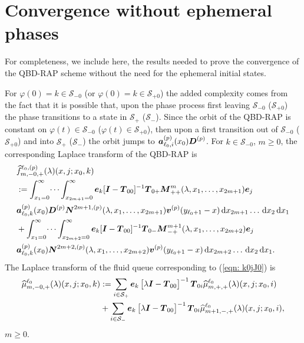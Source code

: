 \chapter{Convergence without ephemeral phases\label{app:extend conv}}
For completeness, we include here, the results needed to prove the convergence of the QBD-RAP scheme without the need for the ephemeral initial states.

For \(\varphi(0)=k\in\mathcal S_{-0}\) (or \(\varphi(0)=k\in\mathcal S_{+0}\)) the added complexity comes from the fact that it is possible that, upon the phase process first leaving \(\mathcal S_{-0}\) (\(\mathcal S_{+0}\)) the phase transitions to a state in \(\mathcal S_+\) (\(\mathcal S_-\)). Since the orbit of the QBD-RAP is constant on \(\varphi(t)\in\mathcal S_{-0}\) (\(\varphi(t)\in\mathcal S_{+0}\)), then upon a first transition out of \(\mathcal S_{-0}\) (\(\mathcal S_{+0}\)) and into \(\mathcal S_+\) (\(\mathcal S_-\)) the orbit jumps to \(\boldsymbol   a_{\ell_0,i}^{(p)}(x_0)\boldsymbol D^{(p)}\). For \(k\in\mathcal S_{-0}\), \(m\geq 0\), the corresponding Laplace transform of the QBD-RAP is
\begin{align}
	&\widehat{f}_{m,-0,+}^{\ell_0,(p)}(\lambda)(x,j;x_0,k)\nonumber 
	\\&:=\int_{x_1=0}^\infty \dots \int_{x_{2m+1}=0}^\infty  \boldsymbol e_k [\boldsymbol I - \boldsymbol T_{00}]^{-1}\boldsymbol T_{0+}\boldsymbol M^m_{++}(\lambda,x_1,\dots,x_{2m+1})\boldsymbol e_j \nonumber
	\\& \boldsymbol a_{\ell_0,k}^{(p)}(x_0) \boldsymbol D^{(p)} \boldsymbol N^{2m+1,(p)}(\lambda,x_1,\dots,x_{2m+1}) {\boldsymbol v}^{(p)}(y_{\ell_0+1}-x)\, \mathrm{d} x_{2m+1}\dots\, \mathrm{d} x_2 \, \mathrm{d} x_1  \nonumber
	\\& + \int_{x_1=0}^\infty \dots \int_{x_{2m+2}=0}^\infty  \boldsymbol e_k [\boldsymbol I - \boldsymbol T_{00}]^{-1}\boldsymbol T_{0-}\boldsymbol M^{m+1}_{-+}(\lambda,x_1,\dots,x_{2m+2})\boldsymbol e_j \nonumber
	\\& \boldsymbol a_{\ell_0,k}^{(p)}(x_0)\boldsymbol N^{2m+2,(p)}(\lambda,x_1,\dots,x_{2m+2}) {\boldsymbol v}^{(p)}(y_{\ell_0+1}-x)\, \mathrm{d} x_{2m+2}\dots\, \mathrm{d} x_2 \, \mathrm{d} x_1.
	\label{eqn: k0jJ0}
\end{align}
The Laplace transform of the fluid queue corresponding to (\ref{eqn: k0jJ0}) is 
\begin{align}
	\widehat \mu_{m,-0,+}^{\ell_0}(\lambda)(x,j;x_0,k) \nonumber 
	&:= \sum_{i\in\mathcal{S}_+}\boldsymbol e_k\begin{bmatrix} \lambda \boldsymbol I - \boldsymbol T_{00} \end{bmatrix}^{-1}\boldsymbol T_{0i}\widehat \mu_{m,+,+}^{\ell_0}(\lambda)(x,j;x_0,i) 
	\\&{}+ \sum_{i\in\mathcal{S}_-}\boldsymbol e_k\begin{bmatrix} \lambda \boldsymbol I - \boldsymbol T_{00} \end{bmatrix}^{-1}\boldsymbol T_{0i}\widehat \mu_{m+1,-,+}^{\ell_0}(\lambda)(x,j;x_0,i), \label{eqn: s0- actual}
\end{align}
\(m\geq 0\).

